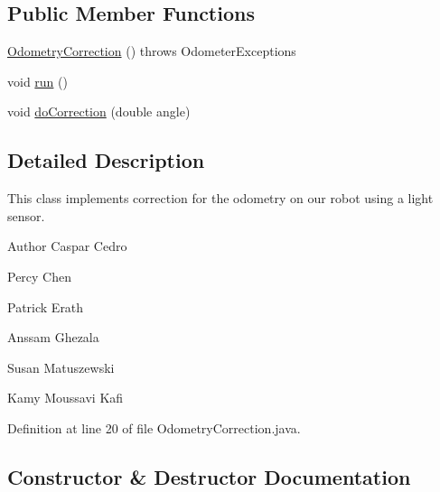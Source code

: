 \subsection*{Public Member Functions}
\begin{DoxyCompactItemize}
\item 
\hyperlink{classca_1_1mcgill_1_1ecse211_1_1odometer_1_1_odometry_correction_ad80b45e0bc4bf935494e075edcec739c}{Odometry\+Correction} ()  throws Odometer\+Exceptions 
\item 
void \hyperlink{classca_1_1mcgill_1_1ecse211_1_1odometer_1_1_odometry_correction_aad66a7030ac00f3a9cbe7bc33c25acbf}{run} ()
\item 
void \hyperlink{classca_1_1mcgill_1_1ecse211_1_1odometer_1_1_odometry_correction_a21a351682dc75060d6a5f15ad4775068}{do\+Correction} (double angle)
\end{DoxyCompactItemize}


\subsection{Detailed Description}
This class implements correction for the odometry on our robot using a light sensor.

\begin{DoxyAuthor}{Author}
Caspar Cedro 

Percy Chen 

Patrick Erath 

Anssam Ghezala 

Susan Matuszewski 

Kamy Moussavi Kafi 
\end{DoxyAuthor}


Definition at line 20 of file Odometry\+Correction.\+java.



\subsection{Constructor \& Destructor Documentation}
\mbox{\label{classca_1_1mcgill_1_1ecse211_1_1odometer_1_1_odometry_correction_ad80b45e0bc4bf935494e075edcec739c}} 
